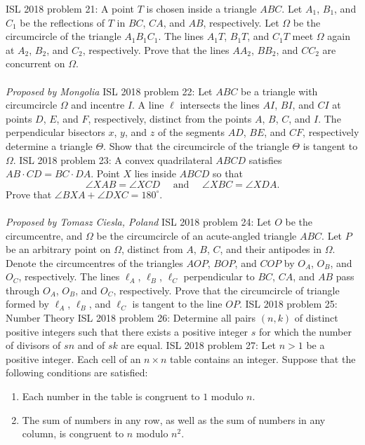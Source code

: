 ISL 2018 problem 21:  A point $T$ is chosen inside a triangle $ABC$. Let $A_1$, $B_1$, and $C_1$ be the reflections of $T$ in $BC$, $CA$, and $AB$, respectively. Let $\Omega$ be the circumcircle of the triangle $A_1B_1C_1$. The lines $A_1T$, $B_1T$, and $C_1T$ meet $\Omega$ again at $A_2$, $B_2$, and $C_2$, respectively. Prove that the lines $AA_2$, $BB_2$, and $CC_2$ are concurrent on $\Omega$. \\\\
\textit{Proposed by Mongolia} 
ISL 2018 problem 22:  Let $ABC$ be a triangle with circumcircle $\Omega$ and incentre $I$. A line $\ell$ intersects the lines $AI$, $BI$, and $CI$ at points $D$, $E$, and $F$, respectively, distinct from the points $A$, $B$, $C$, and $I$. The perpendicular bisectors $x$, $y$, and $z$ of the segments $AD$, $BE$, and $CF$, respectively determine a triangle $\Theta$. Show that the circumcircle of the triangle $\Theta$ is tangent to $\Omega$. 
ISL 2018 problem 23:  A convex quadrilateral $ABCD$ satisfies $AB\cdot CD = BC\cdot DA$. Point $X$ lies inside $ABCD$ so that
\[ \angle{XAB} = \angle{XCD}\quad\,\,\text{and}\quad\,\,\angle{XBC} = \angle{XDA}. \]
Prove that $\angle{BXA} + \angle{DXC} = 180^\circ$. \\\\
\textit{Proposed by Tomasz Ciesla, Poland} 
ISL 2018 problem 24:  Let $O$ be the circumcentre, and $\Omega$ be the circumcircle of an acute-angled triangle $ABC$. Let $P$ be an arbitrary point on $\Omega$, distinct from $A$, $B$, $C$, and their antipodes in $\Omega$. Denote the circumcentres of the triangles $AOP$, $BOP$, and $COP$ by $O_A$, $O_B$, and $O_C$, respectively. The lines $\ell_A$, $\ell_B$, $\ell_C$ perpendicular to $BC$, $CA$, and $AB$ pass through $O_A$, $O_B$, and $O_C$, respectively. Prove that the circumcircle of triangle formed by $\ell_A$, $\ell_B$, and $\ell_C$ is tangent to the line $OP$. 
ISL 2018 problem 25:  Number Theory 
ISL 2018 problem 26:  Determine all pairs $(n, k)$ of distinct positive integers such that there exists a positive integer $s$ for which the number of divisors of $sn$ and of $sk$ are equal. 
ISL 2018 problem 27:  Let $n>1$ be a positive integer. Each cell of an $n\times n$ table contains an integer. Suppose that the following conditions are satisfied:
\begin{enumerate}
  \item Each number in the table is congruent to $1$ modulo $n$.
  \item The sum of numbers in any row, as well as the sum of numbers in any column, is congruent to $n$ modulo $n^2$.
\end{enumerate}
